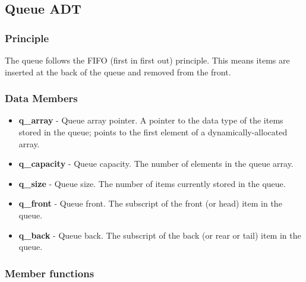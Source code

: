 \documentclass{report}
\begin{document}
     \bigbreak \noindent 
     \subsection{Queue ADT}
     \bigbreak \noindent 
     \subsubsection{Principle}
     \bigbreak \noindent 
     The queue follows the FIFO (first in first out) principle. This means items are inserted at the back of the queue and removed from the front.
     \bigbreak \noindent 
     \subsubsection{Data Members}
     \begin{itemize}
        \item \textbf{q\_array} - Queue array pointer. A pointer to the data type of the items stored in the queue; points to the first element of a dynamically-allocated array.
        \item \textbf{q\_capacity} - Queue capacity. The number of elements in the queue array.
        \item \textbf{q\_size} - Queue size. The number of items currently stored in the queue.
        \item \textbf{q\_front} - Queue front. The subscript of the front (or head) item in the queue.
        \item \textbf{q\_back} - Queue back. The subscript of the back (or rear or tail) item in the queue.
    \end{itemize}
     \bigbreak \noindent 
     \subsubsection{Member functions}
\end{document}

